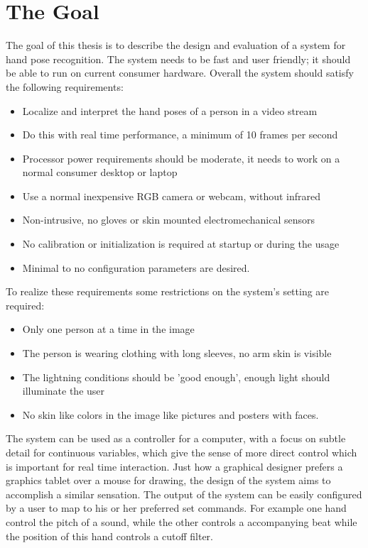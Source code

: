 \section{The Goal}
\label{sec:goal}
The goal of this thesis is to describe the design and evaluation of a system for hand pose recognition. The system needs to be fast and user friendly; it should be able to run on current consumer hardware. Overall the system should satisfy the following requirements:

\begin{itemize}
	\item Localize and interpret the hand poses of a person in a video stream
	\item Do this with real time performance, a minimum of 10 frames per second
	\item Processor power requirements should be moderate, it needs to work on a normal consumer desktop or laptop
	\item Use a normal inexpensive RGB camera or webcam, without infrared
	\item Non-intrusive, no gloves or skin mounted electromechanical sensors
	\item No calibration or initialization is required at startup or during the usage
	\item Minimal to no configuration parameters are desired.
\end{itemize}
	
To realize these requirements some restrictions on the system's setting are required:

\begin{itemize}
	\item Only one person at a time in the image
	\item The person is wearing clothing with long sleeves, no arm skin is visible
	\item The lightning conditions should be 'good enough', enough light should illuminate the user
	\item No skin like colors in the image like pictures and posters with faces.
\end{itemize}

The system can be used as a controller for a computer, with a focus on subtle detail for continuous variables, which give the sense of more direct control which is important for real time interaction. Just how a graphical designer prefers a graphics tablet over a mouse for drawing, the design of the system aims to accomplish a similar sensation. The output of the system can be easily configured by a user to map to his or her preferred set commands. For example one hand control the pitch of a sound, while the other controls a accompanying beat while the position of this hand controls a cutoff filter. 

